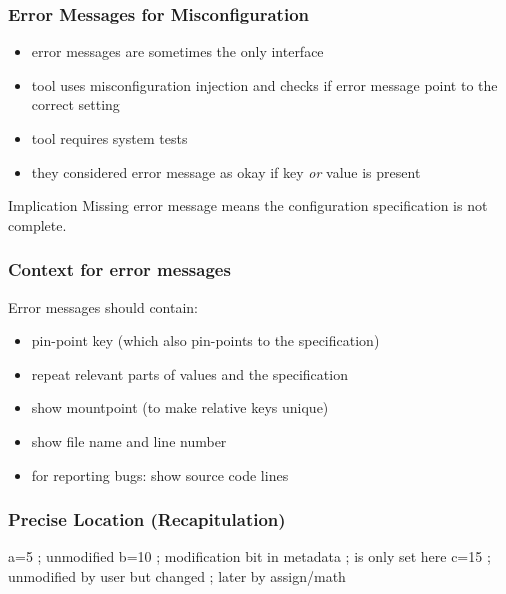 \begin{frame}
	\frametitle{Error Messages for Misconfiguration~\cite{zhang2015proactive}}

	\begin{itemize}[<+-| alert@+>]
	\item error messages are sometimes the only interface
	\item tool uses misconfiguration injection and checks if error message point to the correct setting
	\item tool requires system tests
	\item they considered error message as okay if key \emph{or} value is present
	\end{itemize}

	\pause[\thebeamerpauses]  %

	\begin{alertblock}{Implication}
	Missing error message means the configuration specification is not complete.
	\end{alertblock}
\end{frame}

\begin{frame}
	\frametitle{Context for error messages}

	Error messages should contain:

	\begin{itemize}[<+-| alert@+>]
	\item pin-point key (which also pin-points to the specification)
	\item repeat relevant parts of values and the specification
	\item show mountpoint (to make relative keys unique)
	\item show file name and line number
	\item for reporting bugs: show source code lines
	\end{itemize}
\end{frame}

\begin{frame}[fragile]
	\frametitle{Precise Location (Recapitulation)}

	\begin{code}[language=CfgElektra,gobble=4]
	a=5  ; unmodified
	b=10 ; modification bit in metadata
	     ; is only set here
	c=15 ; unmodified by user but changed
	     ; later by assign/math
	\end{code}
\end{frame}

